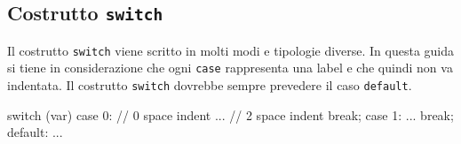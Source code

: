 \subsection{Costrutto \texttt{switch}}

Il costrutto \texttt{switch} viene scritto in molti modi e tipologie diverse.
In questa guida si tiene in considerazione che ogni \texttt{case} rappresenta una label e che quindi non va indentata.
Il costrutto \texttt{switch} dovrebbe sempre prevedere il caso \texttt{default}.

\begin{minipage}[t]{\rbwidth}
\begin{RightCode}
switch (var)
{
case 0:   // 0 space indent
  ...     // 2 space indent
  break;
case 1:
  ...
  break;
default:
  ...
}
\end{RightCode}
\end{minipage}%